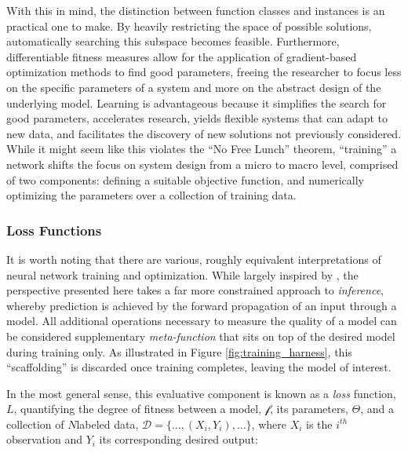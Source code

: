 With this in mind, the distinction between function classes and instances is an practical one to make.
By heavily restricting the space of possible solutions, automatically searching this subspace becomes feasible.
Furthermore, differentiable fitness measures allow for the application of gradient-based optimization methods to find good parameters, freeing the researcher to focus less on the specific parameters of a system and more on the abstract design of the underlying model.
Learning is advantageous because it simplifies the search for good parameters, accelerates research, yields flexible systems that can adapt to new data, and facilitates the discovery of new solutions not previously considered.
While it might seem like this violates the ``No Free Lunch'' theorem, ``training'' a network shifts the focus on system design from a micro to macro level, comprised of two components: defining a suitable objective function, and numerically optimizing the parameters over a collection of training data.


\subsubsection{Loss Functions}

It is worth noting that there are various, roughly equivalent interpretations of neural network training and optimization.
While largely inspired by \cite{LeCun2006}, the perspective presented here takes a far more constrained approach to \emph{inference}, whereby prediction is achieved by the forward propagation of an input through a model.
All additional operations necessary to measure the quality of a model can be considered supplementary \emph{meta-function} that sits on top of the desired model during training only.
As illustrated in Figure \ref{fig:training_harness}, this ``scaffolding'' is discarded once training completes, leaving the model of interest.

In the most general sense, this evaluative component is known as a \emph{loss} function, $L$, quantifying the degree of fitness between a model, $\mathcal{f}$, its parameters, $\Theta$, and a collection of $N$labeled data, $\mathcal{D} = \{ \dots, (X_i, Y_i), \dots \}$, where $X_i$ is the $i^{th}$ observation and $Y_i$ its corresponding desired output:

